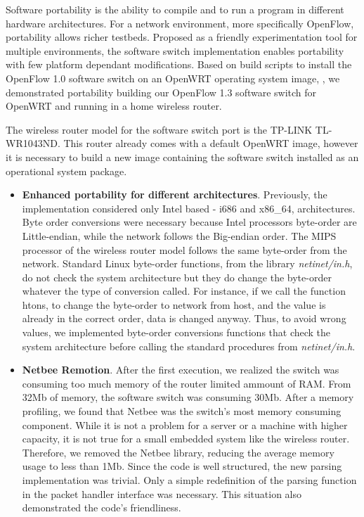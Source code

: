 Software portability is the ability to compile and to run a program in different hardware architectures. For a network environment, more specifically OpenFlow, portability allows richer testbeds. Proposed as a friendly experimentation tool for multiple environments, the software switch implementation enables portability with few platform dependant modifications. Based on build scripts to install the OpenFlow 1.0 software switch on an OpenWRT \cite{OpenWrt} operating system image, \cite{yiakoumis2011}, we demonstrated portability building our OpenFlow 1.3 software switch for OpenWRT and running in a home wireless router.

The wireless router model for the software switch port is the TP-LINK TL-WR1043ND. This router already comes with a default OpenWRT image, however it is necessary to build a new image containing the software switch installed as an operational system package. 

\begin{itemize}
\item \textbf{Enhanced portability for different architectures}. Previously, the implementation considered only Intel based - i686 and x86_64, architectures. Byte order conversions were necessary because Intel processors byte-order are Little-endian, while the network follows the Big-endian order.  The MIPS processor of the wireless router model follows the same byte-order from the network. Standard Linux byte-order functions, from the library \textit{netinet/in.h}, do not check the system architecture but they do change the byte-order whatever the type of conversion called. For instance, if we call the function htons, to change the byte-order to network from host, and the value is already in the correct order, data is changed anyway. Thus, to avoid wrong values, we implemented byte-order conversions functions that check the system architecture before calling the standard procedures from \textit{netinet/in.h}.
\item \textbf{Netbee Remotion}. After the first execution, we realized the switch was consuming too much memory of the router limited ammount of RAM. From 32Mb of memory, the software switch was consuming 30Mb. After a memory profiling, we found that Netbee was the switch's most memory consuming component. While it is not a problem for a server or a machine with higher capacity, it is not true for a small embedded system like the wireless router. Therefore, we removed the Netbee library, reducing the average memory usage to less than 1Mb. Since the code is well structured, the new parsing implementation was trivial. Only a simple redefinition of the parsing function in the packet handler interface was necessary. This situation also demonstrated the code's friendliness. 

\end{itemize}

